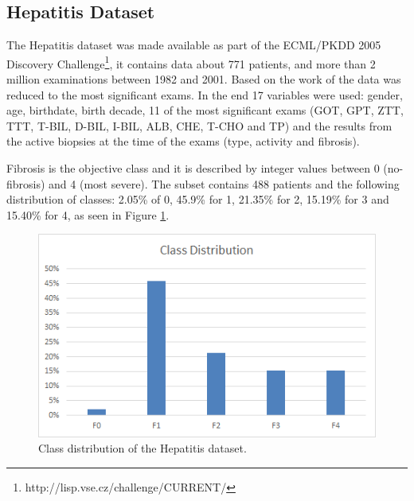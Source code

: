 \subsection{Hepatitis Dataset}
\label{subsection:hepatitis}

The Hepatitis dataset was made available as part of the ECML/PKDD 2005 Discovery 
Challenge\footnote{http://lisp.vse.cz/challenge/CURRENT/}, it contains data about
 771 patients, and more than 2 million examinations between 1982 and 2001. Based on the work of \cite{Watanabe2003}
 the data was reduced to the most significant exams. In the end 17 variables were used: gender, age, birthdate, birth decade, 
 11 of the most significant exams (GOT, GPT, ZTT, TTT, T-BIL, D-BIL, I-BIL, ALB, CHE, T-CHO and TP) and the results from the
 active biopsies at the time of the exams (type, activity and fibrosis).

Fibrosis is the objective class and it is described by integer values between 0 (no-fibrosis) and 4 (most severe).
 The subset contains 488 patients and the following distribution of 
 classes: 2.05\% of 0, 45.9\% for 1, 21.35\% for 2, 15.19\% for 3 and 15.40\% for 4, as seen in Figure \ref{fig:hep_distribution}.
 
   \begin{figure}[h]
   	\centering
   	\includegraphics[width=0.49\linewidth]{Figures/class_distribution_hep.png}
   	\caption{Class distribution of the Hepatitis dataset.}
   	\label{fig:hep_distribution}
   \end{figure}





